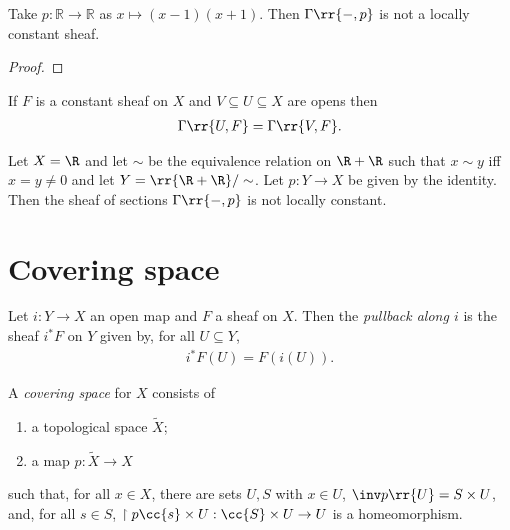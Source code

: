 \documentclass{article}
\begin{document}
\begin{nonexample}
  Take $p: \mathbb{R} \to \mathbb{R}$ as $x \mapsto (x-1)(x+1)$.
  Then $\Gamma\rr{-,p}$ is not a locally constant sheaf.
  \begin{proof}
    \missingproof
  \end{proof}
\end{nonexample}

\begin{lemma}
  If $F$ is a constant sheaf on $X$ and $V\subseteq U\subseteq X$ are opens then
  \begin{align*}
    \Gamma\rr{U, F} = \Gamma\rr{V,F}.
  \end{align*}
\end{lemma}

\begin{example}
  Let $X=\R$ and let $\sim$ be the equivalence relation on $\R+\R$ such that
  $x\sim y$ iff $x=y\neq 0$ and let $Y=\rr{\R+\R}/\sim$. Let $p:Y\to X$ be
  given by the identity. Then the sheaf of sections $\Gamma\rr{-,p}$
  is not locally constant.
\end{example}

\section{Covering space}\label{sec:covering_space}

\begin{definition}
  Let $i:Y\to X$ an open map and $F$ a sheaf on $X$. Then
  the \emph{pullback along $i$} is the sheaf $i^*F$ on $Y$
  given by, for all $U\subseteq Y$,
  \begin{align*}
    i^*F(U) = F(i(U)).
  \end{align*}
\end{definition}


\begin{definition}
  A \emph{covering space} for $X$ consists of
  \begin{enumerate}
    \item a topological space $\tilde X$;
    \item a map $p:\tilde X\to X$
  \end{enumerate}
  such that, for all $x\in X$, there are sets $U,S$ with $x\in U$, $\inv p\rr{U}=S\times U$,
  and, for all $s\in S$, $\restriction{p}{\cc{s}\times U}:\cc{S}\times U\to U$ is a
  homeomorphism.
\end{definition}
\end{document}
